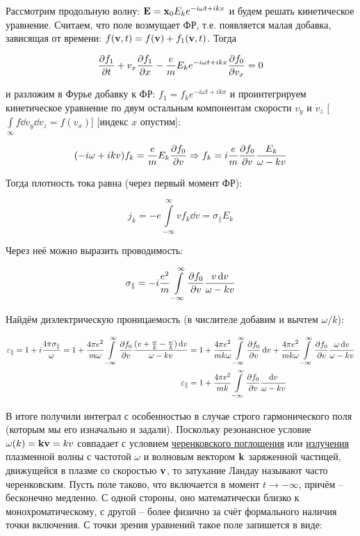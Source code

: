 \documentclass[10pt, a4paper]{article}
\begin{document}
Рассмотрим продольную волну: $\vb{E} = \vb{x}_0E_ke^{-i\omega t+ ikx}$ и будем решать кинетическое уравнение. Считаем, что поле возмущает ФР, т.е. появляется малая добавка, зависящая от времени: $f(\vb{v}, t) = f(\vb{v}) + f_1(\vb{v}, t)$. Тогда

\begin{equation*}
	\pdv{f_1}{t} + v_x\pdv{f_1}{x}-\frac{e}{m}E_ke^{-i\omega t+ ikx}\pdv{f_0}{v_x} = 0
\end{equation*}

и разложим в Фурье добавку к ФР: $f_1 = f_ke^{-i\omega t+ ikx}$ и проинтегрируем кинетическое уравнение по двум остальным компонентам скорости $v_y$ и $v_z$ [$\int\limits_\infty f\dd{v_y}\dd{v_z} = f(v_x)$] [индекс $x$ опустим]:

\begin{equation*}
	(-i\omega+ikv)f_k = \frac{e}{m}E_k\pdv{f_0}{v} \Rightarrow f_k = i\frac{e}{m}\pdv{f_0}{v} \frac{E_k}{\omega-kv}
\end{equation*}

Тогда плотность тока равна (через первый момент ФР):

\begin{equation*}
	j_k = -e \int\limits_{-\infty}^\infty v f_k \dd{v} = \sigma_\parallel E_k
\end{equation*}

Через неё можно выразить проводимость:

\begin{equation*}
	\sigma_\parallel = -i\frac{e^2}{m}\int\limits_{-\infty}^\infty \pdv{f_0}{v} \frac{v\dd{v}}{\omega-kv}
\end{equation*}
	
Найдём диэлектрическую проницаемость (в числителе добавим и вычтем $\omega/k$):

\begin{align*}	
	\varepsilon_\parallel = 1 + i\frac{4\pi\sigma_\parallel}{\omega} = 1 + \frac{4\pi e^2}{m\omega} \int\limits_{-\infty}^\infty \pdv{f_0}{v} \frac{(v+\frac{\omega}{k}-\frac{\omega}{k})\dd{v}}{\omega-kv} &= 1 + \frac{4\pi e^2}{mk\omega} \int\limits_{-\infty}^\infty \pdv{f_0}{v} \dd{v} + \frac{4\pi e^2}{mk\omega} \int\limits_{-\infty}^\infty \pdv{f_0}{v} \frac{\omega\dd{v}}{\omega-kv} \\
	\varepsilon_\parallel &= 1 + \frac{4\pi e^2}{mk} \int\limits_{-\infty}^\infty \pdv{f_0}{v} \frac{\dd{v}}{\omega-kv}
\end{align*}

В итоге получили интеграл с особенностью в случае строго гармонического поля (которым мы его изначально и задали). Поскольку резонансное условие $\omega(k) = \vb{k}\vb{v} = kv$ совпадает с условием \uline{черенковского поглощения} или \uline{излучения} плазменной
волны с частотой $\omega$ и волновым вектором $\vb{k}$ заряженной частицей, движущейся
в плазме со скоростью $\vb{v}$, то затухание Ландау называют часто черенковским. Пусть поле таково, что включается в момент $t\rightarrow-\infty$, причём -- бесконечно медленно. С одной стороны, оно математически близко к монохроматическому, с другой -- более физично за счёт формального наличия точки включения. С точки зрения уравнений такое поле запишется в виде:
\end{document}
